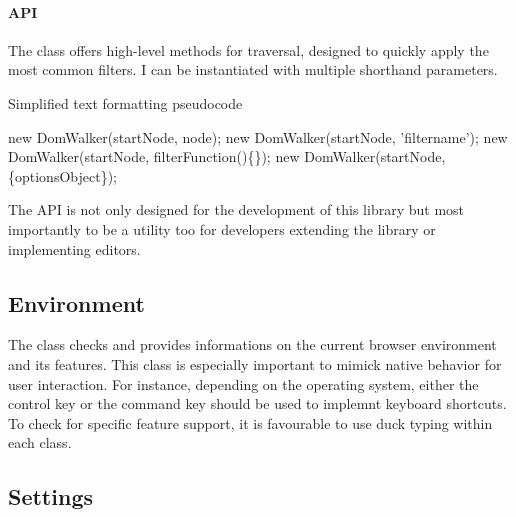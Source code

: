\paragraph{API}

The  class offers high-level methods for traversal, designed to quickly apply the most common filters. I can be instantiated with multiple shorthand parameters.

\begin{algorithm}
\caption{Simplified text formatting pseudocode}
\label{alg:format_pseudocode}
\begin{algorithmic}[1]
\State new DomWalker(startNode, node);
\State new DomWalker(startNode, 'filtername');
\State new DomWalker(startNode, filterFunction()\{\});
\State new DomWalker(startNode,\{optionsObject\});
\end{algorithmic}
\end{algorithm}

\noindent The API is not only designed for the development of this library but most importantly to be a utility too for developers extending the library or implementing editors.



\subsection{Environment}

The  class checks and provides informations on the current browser environment and its features. This class is especially important to mimick native behavior for user interaction. For instance, depending on the operating system, either the control key or the command key should be used to implemnt keyboard shortcuts. To check for specific feature support, it is favourable to use duck typing within each class.



\subsection{Settings}

